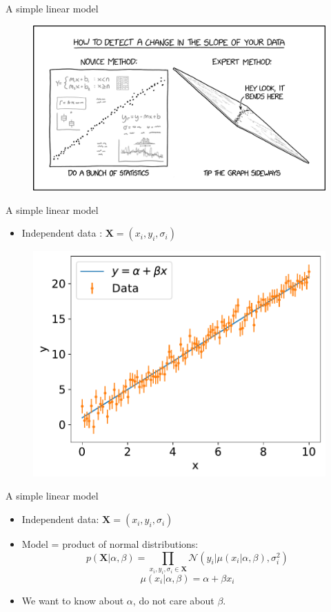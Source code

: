 \documentclass[
aspectratio=169,
14pt,
professionalfonts
]{beamer}
\newcommand{\arrow}{~\ding{220}~}
\begin{document}
\begin{frame}{A simple linear model}
    \begin{figure}
        \centering
        \includegraphics[width=0.8\linewidth]{../plots/change_in_slope_2x.png}
    \end{figure}
\end{frame}

\begin{frame}{A simple linear model}

    \begin{itemize}
        \item Independent data : $\boldsymbol{X} = (x_i, y_i, \sigma_i)$
    \end{itemize}

    \begin{figure}
        \centering
        \includegraphics[width=0.5\linewidth]{../plots/linear_data.pdf}
    \end{figure}

\end{frame}

\begin{frame}{A simple linear model}
    \begin{itemize}
        \item Independent data: $\boldsymbol{X} = (x_i, y_i, \sigma_i)$
        \item[\arrow] Model = product of normal distributions:
        $$ p(\boldsymbol{X}|\alpha, \beta) = \prod_{x_i, y_i,\sigma_i \in \boldsymbol{X}}\mathcal{N}(y_i | \mu(x_i|\alpha, \beta), \sigma_i^2)$$
        $$\mu(x_i|\alpha, \beta) = \alpha + \beta x_i$$
         \item We want to know about $\alpha$, do not care about $\beta$.
    \end{itemize}
\end{frame}
\end{document}
